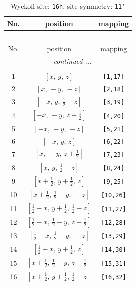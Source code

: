 \documentclass[fleqn,8pt]{jsarticle}
\begin{document}
\begin{longtable}{ccc}
\caption{Wyckoff site: {\tt 16h}, site symmetry: {\tt 11'}}
 \\
 \hline \hline
No. & position & mapping \\ \hline \endfirsthead

\multicolumn{2}{l}{\tablename\ \thetable{}} \\
 \hline \hline
No. & position & mapping \\ \hline \endhead

 \hline \hline
\multicolumn{2}{r}{\footnotesize\it continued ...} \\ \endfoot

 \hline \hline
\multicolumn{2}{r}{} \\ \endlastfoot

1 & $\left[ x,\, y,\, z \right]$ & {\tt [1,17]} \\ \hline
2 & $\left[ x,\, - y,\, - z \right]$ & {\tt [2,18]} \\ \hline
3 & $\left[ - x,\, y,\, \frac{1}{2} - z \right]$ & {\tt [3,19]} \\ \hline
4 & $\left[ - x,\, - y,\, z + \frac{1}{2} \right]$ & {\tt [4,20]} \\ \hline
5 & $\left[ - x,\, - y,\, - z \right]$ & {\tt [5,21]} \\ \hline
6 & $\left[ - x,\, y,\, z \right]$ & {\tt [6,22]} \\ \hline
7 & $\left[ x,\, - y,\, z + \frac{1}{2} \right]$ & {\tt [7,23]} \\ \hline
8 & $\left[ x,\, y,\, \frac{1}{2} - z \right]$ & {\tt [8,24]} \\ \hline
9 & $\left[ x + \frac{1}{2},\, y + \frac{1}{2},\, z \right]$ & {\tt [9,25]} \\ \hline
10 & $\left[ x + \frac{1}{2},\, \frac{1}{2} - y,\, - z \right]$ & {\tt [10,26]} \\ \hline
11 & $\left[ \frac{1}{2} - x,\, y + \frac{1}{2},\, \frac{1}{2} - z \right]$ & {\tt [11,27]} \\ \hline
12 & $\left[ \frac{1}{2} - x,\, \frac{1}{2} - y,\, z + \frac{1}{2} \right]$ & {\tt [12,28]} \\ \hline
13 & $\left[ \frac{1}{2} - x,\, \frac{1}{2} - y,\, - z \right]$ & {\tt [13,29]} \\ \hline
14 & $\left[ \frac{1}{2} - x,\, y + \frac{1}{2},\, z \right]$ & {\tt [14,30]} \\ \hline
15 & $\left[ x + \frac{1}{2},\, \frac{1}{2} - y,\, z + \frac{1}{2} \right]$ & {\tt [15,31]} \\ \hline
16 & $\left[ x + \frac{1}{2},\, y + \frac{1}{2},\, \frac{1}{2} - z \right]$ & {\tt [16,32]} \\
\end{longtable}
\end{document}
